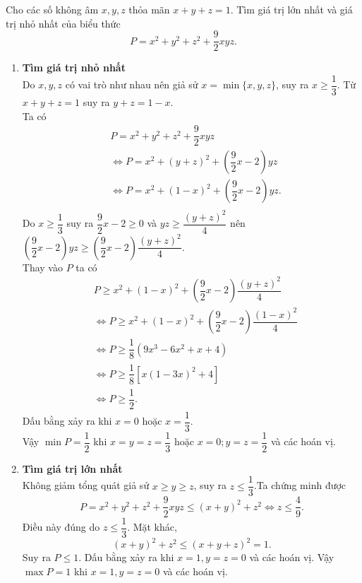 \begin{bt}%
	Cho các số không âm $x, y, z$ thỏa mãn $x+y+z=1$. Tìm giá trị lớn nhất và giá trị nhỏ nhất của biểu thức \[P=x^2+y^2+z^2+\dfrac{9}{2}xyz.\]
	\loigiai
	{
		\begin{enumerate}
			\item {\bf Tìm giá trị nhỏ nhất}\\
			Do $x, y, z$ có vai trò như nhau nên giả sử $x =\min\{x, y, z\}$, suy ra $x \ge \dfrac{1}{3}$. Từ $x+y+z=1$ suy ra $y+z=1-x$.\\
			Ta có 
			\[
			\begin{aligned}
			& P =x^2+y^2+z^2+\dfrac{9}{2}xyz\\ 
			& \Leftrightarrow P=x^2+(y+z)^2+\left( \dfrac{9}{2}x -2\right)yz\\
			&\Leftrightarrow P=x^2+(1-x)^2+\left( \dfrac{9}{2}x -2\right)yz.\\
			\end{aligned}
			\]
			Do $x \ge \dfrac{1}{3}$ suy ra $\dfrac{9}{2}x -2 \ge 0$ và $yz \ge \dfrac{(y+z)^2}{4}$ nên $\left( \dfrac{9}{2}x -2\right)yz \ge \left( \dfrac{9}{2}x -2\right)\dfrac{(y+z)^2}{4}$. \\
			Thay vào $P$ ta có
			\[
			\begin{aligned}
			&P \ge x^2+(1-x)^2+\left( \dfrac{9}{2}x -2\right)\dfrac{(y+z)^2}{4}\\ 
			&\Leftrightarrow P \ge x^2+(1-x)^2+\left( \dfrac{9}{2}x -2\right)\dfrac{(1-x)^2}{4}\\
			&\Leftrightarrow P \ge \dfrac{1}{8} (9x^3-6x^2+x+4)\\
			&\Leftrightarrow P \ge \dfrac{1}{8}\left[ x(1-3x)^2 +4 \right]\\
			& \Leftrightarrow P \ge \dfrac{1}{2}.
			\end{aligned}
			\]
			Dấu bằng xảy ra khi $x=0$ hoặc $x=\dfrac{1}{3}$.\\
			Vậy $\min P =\dfrac{1}{2}$ khi $x=y=z=\dfrac{1}{3}$ hoặc $x=0; y=z=\dfrac{1}{2}$ và các hoán vị.
			\item {\bf Tìm giá trị lớn nhất}\\
			Không giảm tổng quát giả sử $x \ge y \ge z$, suy  ra $z \le \dfrac{1}{3}$.Ta chứng minh được 
			\[P=x^2+y^2+z^2+\dfrac{9}{2}xyz \le (x+y)^2+z^2 \Leftrightarrow z \le \dfrac{4}{9}.\]
			Điều này đúng do $z \le \dfrac{1}{3}$. Mặt khác, 
			\[(x+y)^2+z^2  \le (x+y+z)^2=1.\]
			Suy ra $P \le 1$. Dấu bằng xảy ra khi $x=1, y=z=0$ và các hoán vị. Vậy $\max P=1$ khi $x=1, y=z=0$ và các hoán vị.
		\end{enumerate}
	}
\end{bt}

